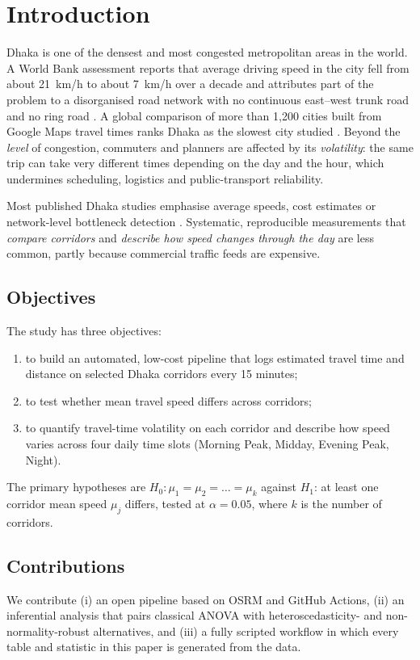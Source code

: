 \documentclass[conference]{IEEEtran}
\begin{document}
\section{Introduction}
Dhaka is one of the densest and most congested metropolitan areas in the world. A World Bank assessment reports that average driving speed in the city fell from about 21~km/h to about 7~km/h over a decade and attributes part of the problem to a disorganised road network with no continuous east--west trunk road and no ring road \cite{worldbank2018dhaka}. A global comparison of more than 1{,}200 cities built from Google Maps travel times ranks Dhaka as the slowest city studied \cite{akbar2023fast}. Beyond the \emph{level} of congestion, commuters and planners are affected by its \emph{volatility}: the same trip can take very different times depending on the day and the hour, which undermines scheduling, logistics and public-transport reliability.

Most published Dhaka studies emphasise average speeds, cost estimates or network-level bottleneck detection \cite{sarker2025bottleneck}. Systematic, reproducible measurements that \emph{compare corridors} and \emph{describe how speed changes through the day} are less common, partly because commercial traffic feeds are expensive.

\subsection{Objectives}
The study has three objectives:
\begin{enumerate}
\item[O1] to build an automated, low-cost pipeline that logs estimated travel time and distance on selected Dhaka corridors every 15 minutes;
\item[O2] to test whether mean travel speed differs across corridors;
\item[O3] to quantify travel-time volatility on each corridor and describe how speed varies across four daily time slots (Morning Peak, Midday, Evening Peak, Night).
\end{enumerate}
The primary hypotheses are $H_0: \mu_1 = \mu_2 = \dots = \mu_k$ against $H_1$: at least one corridor mean speed $\mu_j$ differs, tested at $\alpha = 0.05$, where $k$ is the number of corridors.

\subsection{Contributions}
We contribute (i) an open pipeline based on OSRM \cite{luxen2011real} and GitHub Actions, (ii) an inferential analysis that pairs classical ANOVA with heteroscedasticity- and non-normality-robust alternatives, and (iii) a fully scripted workflow in which every table and statistic in this paper is generated from the data.
\end{document}
